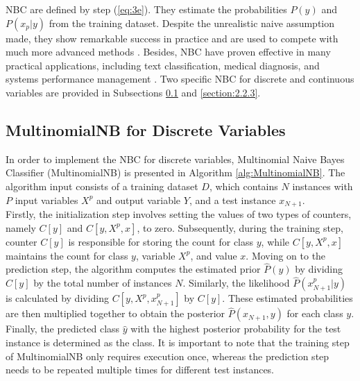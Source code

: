 \documentclass[10pt]{reportMaster}
\begin{document}
\noindent NBC are defined by step (\ref{eq:3e}). They estimate the probabilities $P(y)$ and $P(x_p|y)$ from the training dataset. Despite the unrealistic naive assumption made, they show remarkable success in practice and are used to compete with much more advanced methods \cite{hilden1984statistical, langley1992analysis}. Besides, NBC have proven effective in many practical applications, including text classification, medical diagnosis, and systems performance management \cite{domingos1997optimality, hellerstein2000recognizing, mitchell1997artificial}. Two specific NBC for discrete and continuous variables are provided in Subsections \ref{section:2.2.2} and \ref{section:2.2.3}.

\subsection{MultinomialNB for Discrete Variables} \label{section:2.2.2}

In order to implement the NBC for discrete variables, Multinomial Naive Bayes Classifier (MultinomialNB) is presented in Algorithm \ref{alg:MultinomialNB}. The algorithm input consists of a training dataset $D$, which contains $N$ instances with $P$ input variables $X^p$ and output variable $Y$, and a test instance $x_{N+1}$.\\ 

\noindent Firstly, the initialization step involves setting the values of two types of counters, namely $C[y]$ and $C[y, X^p,x]$, to zero. Subsequently, during the training step, counter $C[y]$ is responsible for storing the count for class $y$, while $C[y, X^p,x]$ maintains the count for class $y$, variable $X^p$, and value $x$. Moving on to the prediction step, the algorithm computes the estimated prior $\hat{P}(y)$ by dividing $C[y]$ by the total number of instances $N$. Similarly, the likelihood $\hat{P}(x_{N+1}^p|y)$ is calculated by dividing $C[y, X^p, x_{N+1}^p]$ by $C[y]$. These estimated probabilities are then multiplied together to obtain the posterior $\hat{P}(x_{N+1},y)$ for each class $y$. Finally, the predicted class $\hat{y}$ with the highest posterior probability for the test instance is determined as the class. It is important to note that the training step of MultinomialNB only requires execution once, whereas the prediction step needs to be repeated multiple times for different test instances.
\end{document}
